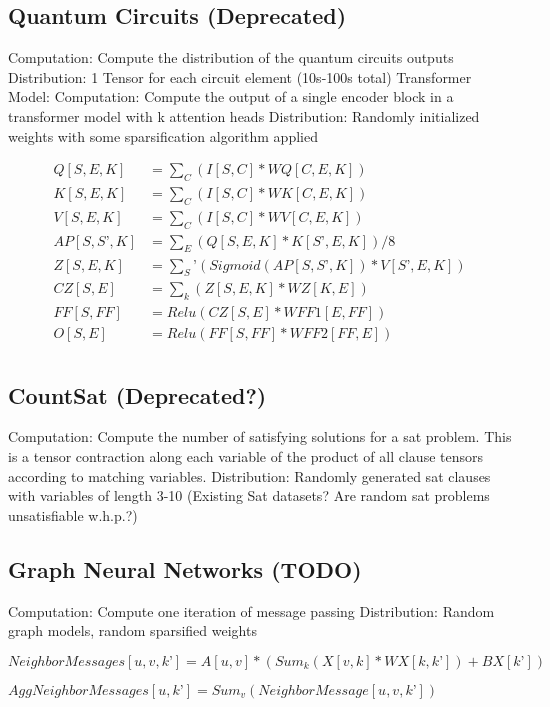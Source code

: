 \documentclass{article}
\begin{document}
\subsection{Quantum Circuits (Deprecated)}
	Computation: Compute the distribution of the quantum circuits outputs
	Distribution: 1 Tensor for each circuit element (10s-100s total)
Transformer Model:
	Computation: Compute the output of a single encoder block in a transformer model with k attention heads
	Distribution: Randomly initialized weights with some sparsification algorithm applied
 
 \begin{align*}
Q[S, E, K] &= \sum_C(I[S, C] * WQ[C, E, K])\\
K[S, E, K] &= \sum_C(I[S, C] * WK[C, E, K])\\
V[S, E, K] &= \sum_C(I[S, C] * WV[C, E, K])\\
AP[S, S’, K] &= \sum_E(Q[S, E, K] * K[S’, E, K]) / 8\\
Z[S, E, K] &= \sum_S’(Sigmoid(AP[S,S’,K]) * V[S’, E, K])\\
CZ[S, E] &= \sum_k(Z[S, E, K] * WZ[K,E])\\
FF[S,FF] &= Relu(CZ[S,E] * WFF1[E,FF])\\
O[S,E] &= Relu(FF[S,FF] * WFF2[FF,E])\\
\end{align*}

\subsection{CountSat (Deprecated?)}
	Computation: Compute the number of satisfying solutions for a sat problem. This is a tensor contraction along each variable of the product of all clause tensors according to matching variables.
	Distribution: Randomly generated sat clauses with variables of length 3-10 (Existing Sat datasets? Are random sat problems unsatisfiable w.h.p.?)

\subsection{Graph Neural Networks (TODO)}
	Computation: Compute one iteration of message passing
	Distribution: Random graph models, random sparsified weights

$NeighborMessages[u, v, k’] = A[u, v]*(Sum_k(X[v, k]*WX[k, k’]) +BX[k’])  $

$AggNeighborMessages[u, k’] = Sum_v(NeighborMessage[u, v, k’])$
\end{document}
